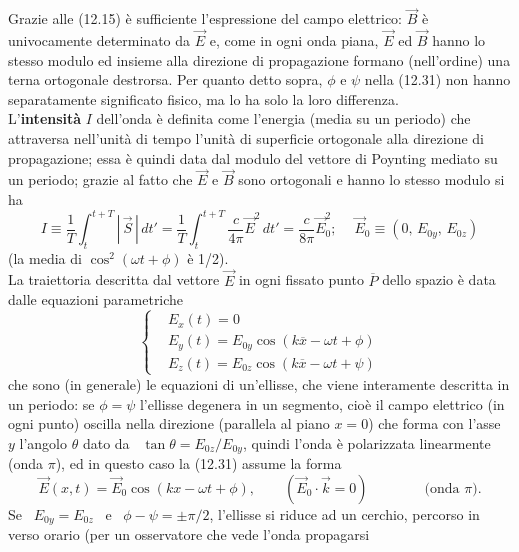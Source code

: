 Grazie alle (12.15) \`e sufficiente l'espressione del campo elettrico: $\vec B$
\`e univocamente determinato da $\vec E$ e, come in ogni onda piana, $\vec E$ ed
$\vec B$ hanno lo stesso modulo ed insieme alla direzione di propagazione
formano (nell'ordine) una terna ortogonale destrorsa. Per quanto detto sopra,
$\phi$ e $\psi$ nella (12.31) non hanno separatamente significato fisico, ma lo
ha solo la loro differenza.\\
L'\textbf{intensit\`a} $I$ dell'onda \`e definita come l'energia (media su un
periodo) che attraversa nell'unit\`a di tempo l'unit\`a di superficie ortogonale
alla direzione di propagazione; essa \`e quindi data dal modulo del vettore di
Poynting mediato su un periodo; grazie al fatto che $\vec E$ e $\vec B$ sono
ortogonali e hanno lo stesso modulo si ha
\begin{equation}
  I\equiv\frac{1}{T}\int_t^{t+T}|\,\vec S\,|\,dt'
  =\frac{1}{T}\int_t^{t+T}\frac{c}{4\pi}\vec E^2\,dt'=\frac{c}{8\pi}\vec E_0^2;
  \quad\ \vec E_0\equiv(0,\,E_{0y},\,E_{0z})
  \tag{12.32}
\end{equation}
(la media di $\cos^2(\omega t+\phi)$ \`e 1/2).\\
La traiettoria descritta dal vettore $\vec E$ in ogni fissato punto
$\overline P$ dello spazio \`e data dalle equazioni parametriche
\begin{equation}
  \left\{\begin{aligned}
    &E_x(t)=0\\
    &E_y(t)=E_{0y}\cos(k\overline x-\omega t+\phi)\\
    &E_z(t)=E_{0z}\cos(k\overline x-\omega t+\psi)
  \end{aligned}\right.
  \tag{12.33}
\end{equation}
che sono (in generale) le equazioni di un'ellisse, che viene interamente
descritta in un periodo: se $\phi=\psi$ l'ellisse degenera in un segmento,
cio\`e il campo elettrico (in ogni punto) oscilla nella direzione (parallela al
piano $x=0$) che forma con l'asse $y$ l'angolo $\theta$ dato da
\ $\tan\theta=E_{0z}/E_{0y}$, quindi l'onda \`e polarizzata linearmente (onda
$\pi$), ed in questo caso la (12.31) assume la forma
\begin{equation}
  \vec E(x,t)=\vec E_0\cos(kx-\omega t+\phi),\qquad(\vec E_0\cdot\vec
  k=0)\qquad\qquad\text{(onda $\pi$)}.
  \tag{12.34}
\end{equation}
Se \ $E_{0y}=E_{0z}$ \ e \ $\phi-\psi=\pm\pi/2$, l'ellisse si riduce ad un
cerchio, percorso in verso orario (per un osservatore che vede l'onda propagarsi
